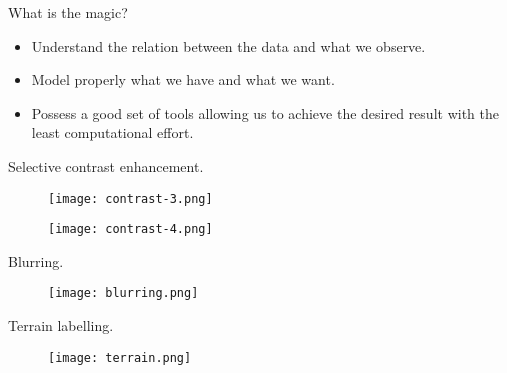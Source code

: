 
\begin{frame}
What is the magic?
\begin{itemize}
\item Understand the relation between the data and what we observe.
\item Model properly what we have and what we want.
\item Possess a good set of tools allowing us to achieve the desired result with the least computational effort.
\end{itemize}
\end{frame}


\begin{frame}
Selective contrast enhancement.
\begin{figure}
\centering
\texttt{[image: contrast-3.png]}
\end{figure}
\end{frame}


\begin{frame}
\begin{figure}
\centering
\texttt{[image: contrast-4.png]}
\end{figure}
\end{frame}


\begin{frame}
Blurring.
\begin{figure}
\centering
\texttt{[image: blurring.png]}
\end{figure}
\end{frame}


\begin{frame}
Terrain labelling.
\begin{figure}
\centering
\texttt{[image: terrain.png]}
\end{figure}
\end{frame}

